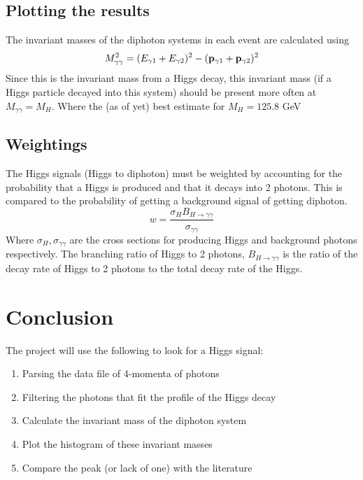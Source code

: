 \documentclass{article}
\begin{document}
\subsection{Plotting the results}
The invariant masses of the diphoton systems in each event are calculated using
\begin{equation}
M_{\gamma \gamma}^2 = (E_{\gamma 1} + E_{\gamma 2})^2 - ({\bf p}_{\gamma 1} + {\bf p}_{\gamma 2})^2
\end{equation}
Since this is the invariant mass from a Higgs decay, this invariant mass (if a Higgs particle decayed into this system) should be present more often at $M_{\gamma \gamma} = M_{H}$. Where the (as of yet) best estimate for $M_{H} = 125.8$ GeV
\subsection{Weightings}
The Higgs signals (Higgs to diphoton) must be weighted by accounting for the probability that a Higgs is produced and that it decays into 2 photons. This is compared to the probability of getting a background signal of getting diphoton.
\begin{equation}
w = \frac{\sigma_{H} B_{H \rightarrow \gamma \gamma}}{\sigma_{\gamma \gamma}}
\end{equation}
Where $\sigma_{H}, \sigma_{\gamma \gamma}$ are the cross sections for producing Higgs and background photons respectively. The branching ratio of Higgs to 2 photons, $B_{H \rightarrow \gamma \gamma}$ is the ratio of the decay rate of Higgs to 2 photons to the total decay rate of the Higgs.
\section{Conclusion}
The project will use the following to look for a Higgs signal:
\begin{enumerate}
\item Parsing the data file of 4-momenta of photons
\item Filtering the photons that fit the profile of the Higgs decay
\item Calculate the invariant mass of the diphoton system
\item Plot the histogram of these invariant masses
\item Compare the peak (or lack of one) with the literature
\end{enumerate}
\end{document}
